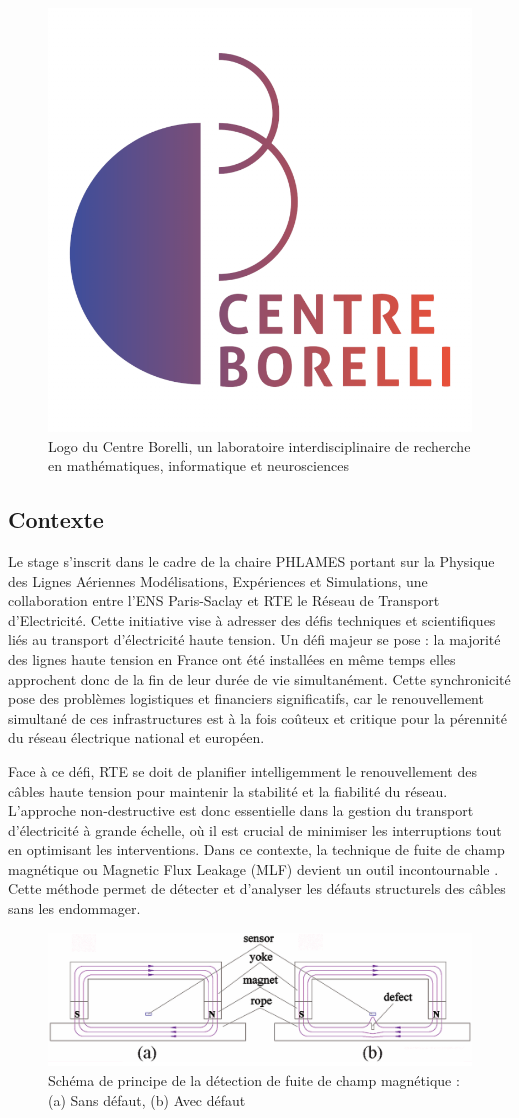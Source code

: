 \documentclass[9pt,a4paper,twoside]{rho}
\begin{document}
\begin{figure}[H]
    \centering
    \includegraphics[width=0.3\linewidth]{images/borelli.png}
    \caption{Logo du Centre Borelli, un laboratoire interdisciplinaire de recherche en mathématiques, informatique et neurosciences}
    \label{fig:lab2}
\end{figure}

\subsection{Contexte}

Le stage s'inscrit dans le cadre de la chaire PHLAMES portant sur la Physique des Lignes Aériennes Modélisations, Expériences et Simulations, une collaboration entre l'ENS Paris-Saclay et RTE le Réseau de Transport d'Electricité. Cette initiative vise à adresser des défis techniques et scientifiques liés au transport d'électricité haute tension.
Un défi majeur se pose : la majorité des lignes haute tension en France ont été installées en même temps elles approchent donc de la fin de leur durée de vie simultanément.
Cette synchronicité pose des problèmes logistiques et financiers significatifs, car le renouvellement simultané de ces infrastructures est à la fois coûteux et critique pour la pérennité du réseau électrique national et européen.

Face à ce défi, RTE se doit de planifier intelligemment le renouvellement des câbles haute tension pour maintenir la stabilité et la fiabilité du réseau.
L'approche non-destructive est donc essentielle dans la gestion du transport d'électricité à grande échelle, où il est crucial de minimiser les interruptions tout en optimisant les interventions.
Dans ce contexte, la technique de fuite de champ magnétique ou Magnetic Flux Leakage (MLF) devient un outil incontournable \cite{broken_wire}. Cette méthode permet de détecter et d'analyser les défauts structurels des câbles sans les endommager.

\begin{figure}[H]
    \centering
    \includegraphics[width=1\linewidth]{images/magnetic_flux_leakage.png}
    \caption{Schéma de principe de la détection de fuite de champ magnétique : (a) Sans défaut, (b) Avec défaut}
    \label{fig:mfl}
\end{figure}
\end{document}
